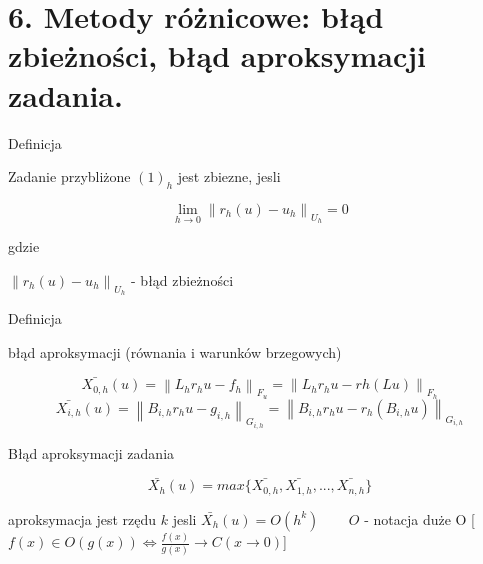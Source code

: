 \section{6. Metody różnicowe: błąd zbieżności, błąd aproksymacji zadania.}

Definicja

Zadanie przybliżone $(1)_h$ jest zbiezne, jesli

\[ \lim_{h \rightarrow 0} \left \| r_h(u) - u_h \right \|_{U_h} = 0 \]

gdzie

$\left \| r_h(u) - u_h \right \|_{U_h}$ - błąd zbieżności

Definicja

błąd aproksymacji (równania i warunków brzegowych)

\[ \bar{X_{0,h}} (u) = \left \| L_h r_h u - f_h \right \| _{F_u} = \left \| L_hr_hu - rh(Lu) \right \| _{F_h} \]
\[ \bar{X_{i,h}} (u) = \left \| B_{i,h} r_h u - g_{i,h} \right \|_{G_{i,h}} = \left \| B_{i,h} r_h u - r_h (B_{i,h} u) \right \| _{G_{i,h}} \]

Błąd aproksymacji zadania

\[ \bar{X_h} (u) = max \{ \bar{X_{0,h}}, \bar{X_{1,h}}, ..., \bar{X_{n,h}} \} \]

aproksymacja jest rzędu $k$ jesli $\bar{X_h} (u) = O(h^k)$ $\ \ \ \ \ \ \ \ O$ - notacja duże O [$ f(x) \in O(g(x)) \Leftrightarrow \frac{f(x)}{g(x)} \rightarrow C (x \rightarrow 0)$]



